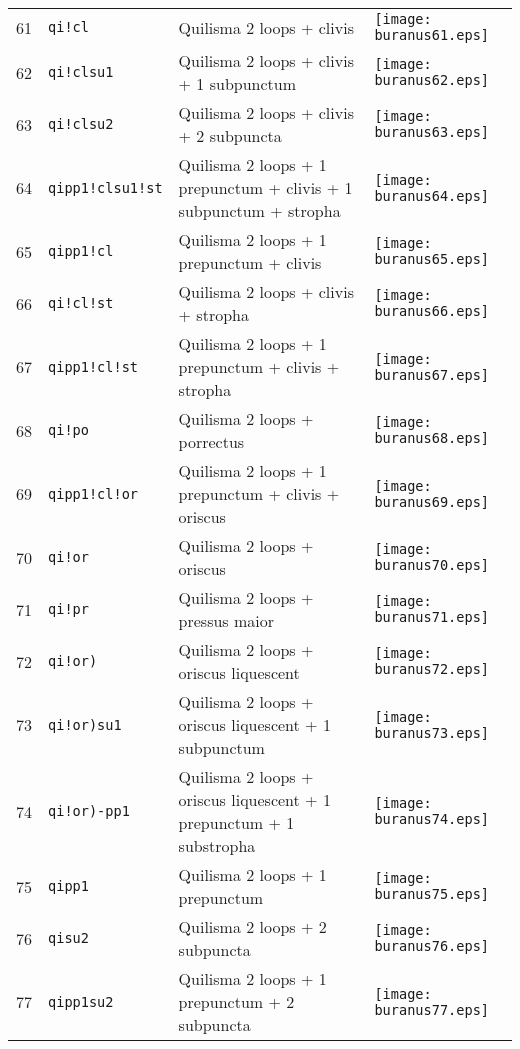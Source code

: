 \documentclass{scrarticle}
\begin{document}
\begin{longtable}{l|l|l|l}
61 & \texttt{qi!cl} & Quilisma 2 loops + clivis & \texttt{[image: buranus61.eps]} \\
62 & \texttt{qi!clsu1} & Quilisma 2 loops + clivis + 1 subpunctum & \texttt{[image: buranus62.eps]} \\
63 & \texttt{qi!clsu2} & Quilisma 2 loops + clivis + 2 subpuncta & \texttt{[image: buranus63.eps]} \\
64 & \texttt{qipp1!clsu1!st} & Quilisma 2 loops + 1 prepunctum + clivis + 1 subpunctum + stropha & \texttt{[image: buranus64.eps]} \\
65 & \texttt{qipp1!cl} & Quilisma 2 loops + 1 prepunctum + clivis & \texttt{[image: buranus65.eps]} \\
66 & \texttt{qi!cl!st} & Quilisma 2 loops + clivis + stropha & \texttt{[image: buranus66.eps]} \\
67 & \texttt{qipp1!cl!st} & Quilisma 2 loops + 1 prepunctum + clivis + stropha & \texttt{[image: buranus67.eps]} \\
68 & \texttt{qi!po} & Quilisma 2 loops + porrectus & \texttt{[image: buranus68.eps]} \\
69 & \texttt{qipp1!cl!or} & Quilisma 2 loops + 1 prepunctum + clivis + oriscus & \texttt{[image: buranus69.eps]} \\
70 & \texttt{qi!or} & Quilisma 2 loops + oriscus & \texttt{[image: buranus70.eps]} \\
71 & \texttt{qi!pr} & Quilisma 2 loops + pressus maior & \texttt{[image: buranus71.eps]} \\
72 & \texttt{qi!or)} & Quilisma 2 loops + oriscus liquescent & \texttt{[image: buranus72.eps]} \\
73 & \texttt{qi!or)su1} & Quilisma 2 loops + oriscus liquescent + 1 subpunctum & \texttt{[image: buranus73.eps]} \\
74 & \texttt{qi!or)-pp1} & Quilisma 2 loops + oriscus liquescent + 1 prepunctum + 1 substropha & \texttt{[image: buranus74.eps]} \\
75 & \texttt{qipp1} & Quilisma 2 loops + 1 prepunctum & \texttt{[image: buranus75.eps]} \\
76 & \texttt{qisu2} & Quilisma 2 loops + 2 subpuncta & \texttt{[image: buranus76.eps]} \\
77 & \texttt{qipp1su2} & Quilisma 2 loops + 1 prepunctum + 2 subpuncta & \texttt{[image: buranus77.eps]} \\

\end{longtable}
\end{document}
